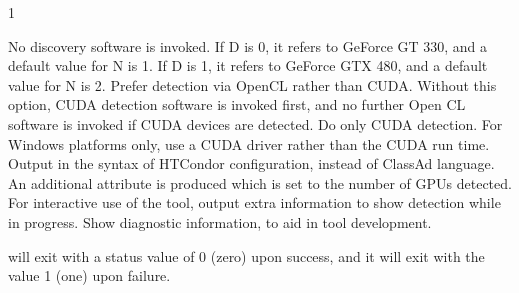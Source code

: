 \begin{ManPage}{\label{man-condor-gpu-discovery}}{1}
\begin{Options}
{    No discovery software is invoked.
    If D is 0, it refers to GeForce GT 330, and a default value for N is 1.
    If D is 1, it refers to GeForce GTX 480, and a default value for N is 2.
  }
   {
    Prefer detection via OpenCL rather than CUDA.
    Without this option, CUDA detection software is invoked first,
    and no further Open CL software is invoked if CUDA devices are detected.
  }
   {
    Do only CUDA detection.
  }
   {
    For Windows platforms only, use a CUDA driver rather than the
    CUDA run time.
  }
   {
    Output in the syntax of 
    HTCondor configuration, instead of ClassAd language.
    An additional attribute is produced  which
    is set to the number of GPUs detected.
  }
   {
    For interactive use of the tool, output extra information to show 
    detection while in progress.
  }
   {
    Show diagnostic information, to aid in tool development.
  }
\end{Options}

\ExitStatus

 will exit with a status value of 0 (zero) upon success,
and it will exit with the value 1 (one) upon failure.


\end{ManPage}
